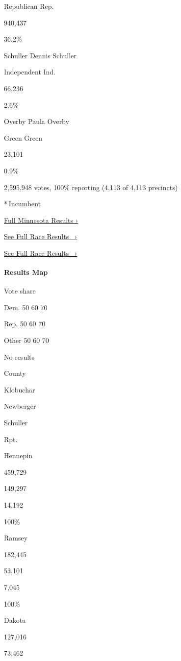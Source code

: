 Republican Rep.

940,437

36.2\%

 Schuller Dennis Schuller

Independent Ind.

66,236

2.6\%

 Overby Paula Overby

Green Green

23,101

0.9\%

2,595,948 votes, 100\% reporting (4,113 of 4,113 precincts)

* Incumbent

\href{https://www.nytimes3xbfgragh.onion/interactive/2018/11/06/us/elections/results-minnesota-elections.html}{Full
Minnesota Results ›}

\href{https://www.nytimes3xbfgragh.onion/elections/results/minnesota-senate}{See
Full Race Results~ ›}

\href{https://www.nytimes3xbfgragh.onion/elections/results/minnesota-senate}{See
Full Race Results~ ›}

\hypertarget{results-map}{%
\paragraph{Results Map}\label{results-map}}

Vote share

Dem. 50 60 70

Rep. 50 60 70

Other 50 60 70

No results

County

Klobuchar

Newberger

Schuller

Rpt.

Hennepin

459,729

149,297

14,192

100\%

Ramsey

182,445

53,101

7,045

100\%

Dakota

127,016

73,462

